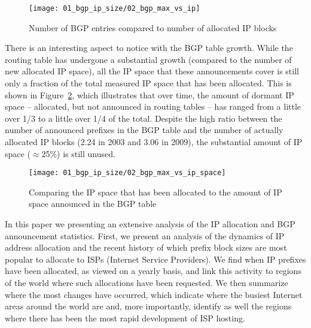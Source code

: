 \begin{figure}[htbp]
	\centering
		\texttt{[image: 01\_bgp\_ip\_size/02\_bgp\_max\_vs\_ip]}
	\caption{Number of BGP entries compared to number of allocated IP blocks}
	\label{fig:BGP vs RIR}
\end{figure}

There is an interesting aspect to notice with the BGP table growth. While the
routing table has undergone a substantial growth (compared to the number of
new allocated IP space), all the IP space that these announcements cover is
still only a fraction of the total measured IP space that has been allocated.
This is shown in Figure~\ref{fig:BGP vs RIR space}, which illustrates that
over time, the amount of dormant IP space -- allocated, but not announced in
routing tables -- has ranged from a little over 1/3 to a little over 1/4 of
the total. Despite the high ratio between the number of announced prefixes in
the BGP table and the number of actually allocated IP blocks (2.24 in 2003 and
3.06 in 2009), the substantial amount of IP space ($\approx$25\%) is still unused.

\begin{figure}[htbp]
	\centering
\texttt{[image: 01\_bgp\_ip\_size/02\_bgp\_max\_vs\_ip\_space]}
	\caption{Comparing the IP space that has been allocated to the amount of IP space announced in the BGP table}
	\label{fig:BGP vs RIR space}
\end{figure}


% 
%

In this paper we presenting an extensive analysis of the IP allocation and BGP
announcement statistics. First, we present an analysis of the dynamics of IP
address allocation and the recent history of which prefix block sizes are most
popular to allocate to ISPs (Internet Service Providers). We find when IP
prefixes have been allocated, as viewed on a yearly basis, and link this
activity to regions of the world where such allocations have been requested.
We then summarize where the most changes have occurred, which indicate where
the busiest Internet areas around the world are and, more importantly,
identify as well the regions where there has been the most rapid development
of ISP hosting.

